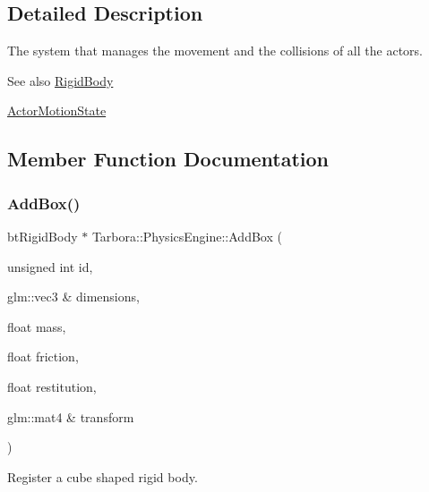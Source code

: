 \subsection{Detailed Description}
The system that manages the movement and the collisions of all the actors. 

\begin{DoxySeeAlso}{See also}
\hyperlink{classTarbora_1_1RigidBody}{Rigid\+Body} 

\hyperlink{classTarbora_1_1ActorMotionState}{Actor\+Motion\+State} 
\end{DoxySeeAlso}


\subsection{Member Function Documentation}
\mbox{\label{classTarbora_1_1PhysicsEngine_a4ec40e1a3ab05c7fe1e0216534484750}} 
\subsubsection{\texorpdfstring{Add\+Box()}{AddBox()}}
{\footnotesize\ttfamily bt\+Rigid\+Body $\ast$ Tarbora\+::\+Physics\+Engine\+::\+Add\+Box (\begin{DoxyParamCaption}\item[{unsigned int}]{id,  }\item[{glm\+::vec3 \&}]{dimensions,  }\item[{float}]{mass,  }\item[{float}]{friction,  }\item[{float}]{restitution,  }\item[{glm\+::mat4 \&}]{transform }\end{DoxyParamCaption})\hspace{0.3cm}{\ttfamily [static]}}



Register a cube shaped rigid body. 


